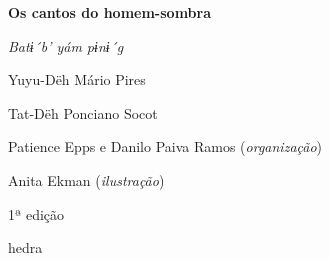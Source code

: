 




\begingroup\thispagestyle{empty}\vspace*{.05\textheight} 

              \formular
              \huge
              \noindent
              \textbf{Os cantos do homem-sombra}

              \bigskip  
              
              \large
              \noindent
              \textit{Batɨ´b’ yám pɨnɨ´g}
              \vspace{12.5em}

              \Large\noindent
              Yuyu-Dëh Mário Pires

              \noindent Tat-Dëh Ponciano Socot
              
              \vspace{3em}
              
              \newfontfamily{}
              {\selectfont\garamond\small\noindent Patience Epps e Danilo Paiva Ramos (\textit{organização})}

              {\selectfont\garamond\small\noindent Anita Ekman (\textit{ilustração})}

              \bigskip

              \noindent
              {\selectfont\garamond\small\noindent 1ª edição}

              \vfill

              \newfontfamily{}
              {\noindent\fontsize{30}{40}\selectfont \timesnewroman hedra}



\endgroup
\pagebreak
